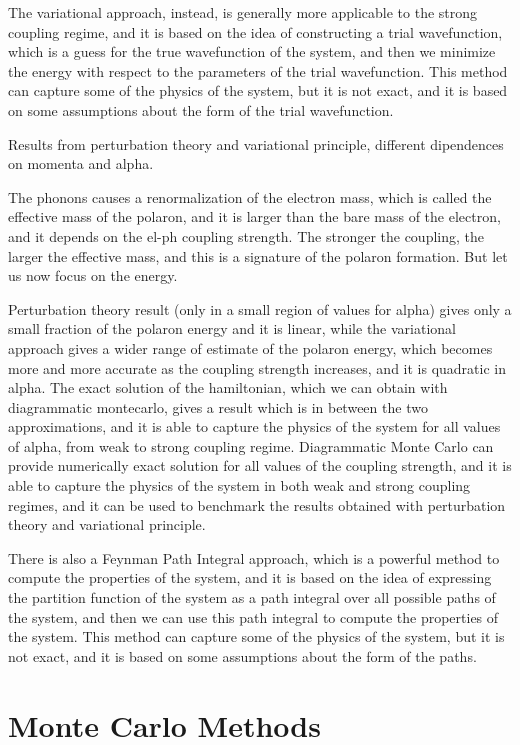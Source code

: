 The variational approach, instead, is generally more applicable to the strong coupling regime, and it is based on the idea of constructing a trial wavefunction, which is a guess for the true wavefunction of the system, and then we minimize the energy with respect to the parameters of the trial wavefunction. This method can capture some of the physics of the system, but it is not exact, and it is based on some assumptions about the form of the trial wavefunction.

Results from perturbation theory and variational principle, different dipendences on momenta and alpha.

The phonons causes a renormalization of the electron mass, which is called the effective mass of the polaron, and it is larger than the bare mass of the electron, and it depends on the el-ph coupling strength. The stronger the coupling, the larger the effective mass, and this is a signature of the polaron formation. But let us now focus on the energy.

Perturbation theory result (only in a small region of values for alpha) gives only a small fraction of the polaron energy and it is linear, while the variational approach gives a wider range of estimate of the polaron energy, which becomes more and more accurate as the coupling strength increases, and it is quadratic in alpha. The exact solution of the hamiltonian, which we can obtain with diagrammatic montecarlo, gives a result which is in between the two approximations, and it is able to capture the physics of the system for all values of alpha, from weak to strong coupling regime. Diagrammatic Monte Carlo can provide numerically exact solution for all values of the coupling strength, and it is able to capture the physics of the system in both weak and strong coupling regimes, and it can be used to benchmark the results obtained with perturbation theory and variational principle.

There is also a Feynman Path Integral approach, which is a powerful method to compute the properties of the system, and it is based on the idea of expressing the partition function of the system as a path integral over all possible paths of the system, and then we can use this path integral to compute the properties of the system. This method can capture some of the physics of the system, but it is not exact, and it is based on some assumptions about the form of the paths.

\section{Monte Carlo Methods}

